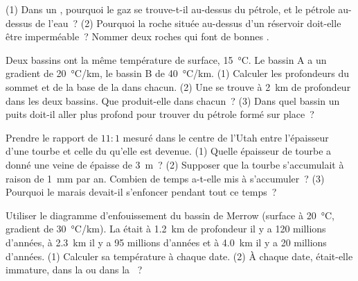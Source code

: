 \begin{exercise}[$\star$]\label{exo:g11:fossil-fuel-geology:5}
(1) Dans un , pourquoi le gaz se trouve-t-il au-dessus du pétrole, et
le pétrole au-dessus de l'eau~? (2) Pourquoi la roche située au-dessus d'un
réservoir doit-elle être imperméable~? Nommer deux roches qui font de
bonnes .
\end{exercise}

\begin{exercise}[$\star\star$]\label{exo:g11:fossil-fuel-geology:6}
Deux bassins ont la même température de surface,
\qty{15}{\degreeCelsius}. Le bassin A a un gradient de
\qty{20}{\degreeCelsius/km}, le bassin B de \qty{40}{\degreeCelsius/km}.
(1) Calculer les profondeurs du sommet et de la base de la 
dans chacun. (2) Une  se trouve à \qty{2}{km} de profondeur dans
les deux bassins. Que produit-elle dans chacun~? (3) Dans quel bassin un
puits doit-il aller plus profond pour trouver du pétrole formé sur place~?
\end{exercise}

\begin{exercise}[$\star\star$]\label{exo:g11:fossil-fuel-geology:7}
Prendre le rapport de $11{:}1$ mesuré dans le centre de l'Utah entre
l'épaisseur d'une tourbe et celle du  qu'elle est devenue.
(1) Quelle épaisseur de tourbe a donné une veine de  épaisse de
\qty{3}{m}~? (2) Supposer que la tourbe s'accumulait à raison de
\qty{1}{mm} par an. Combien de temps a-t-elle mis à s'accumuler~?
(3) Pourquoi le marais devait-il s'enfoncer pendant tout ce temps~?
\end{exercise}

\begin{exercise}[$\star\star$]\label{exo:g11:fossil-fuel-geology:8}
Utiliser le diagramme d'enfouissement du bassin de Merrow (surface à
\qty{20}{\degreeCelsius}, gradient de \qty{30}{\degreeCelsius/km}). La
 était à \qty{1.2}{km} de profondeur il y a 120 millions
d'années, à \qty{2.3}{km} il y a 95 millions d'années et à \qty{4.0}{km} il
y a 20 millions d'années. (1) Calculer sa température à chaque date.
(2) À chaque date, était-elle immature, dans la  ou dans la
~?
\end{exercise}

